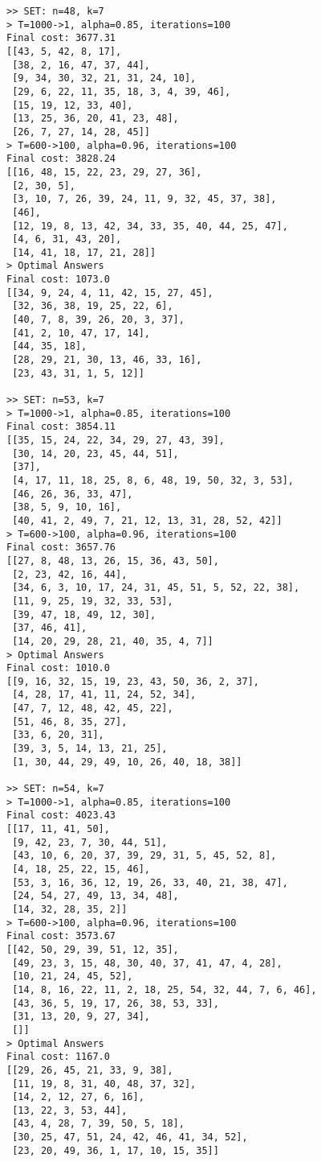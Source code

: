 \documentclass[12pt]{article}
\begin{document}
\begin{lstlisting}[breaklines=true]
>> SET: n=48, k=7
> T=1000->1, alpha=0.85, iterations=100
Final cost: 3677.31
[[43, 5, 42, 8, 17],
 [38, 2, 16, 47, 37, 44],
 [9, 34, 30, 32, 21, 31, 24, 10],
 [29, 6, 22, 11, 35, 18, 3, 4, 39, 46],
 [15, 19, 12, 33, 40],
 [13, 25, 36, 20, 41, 23, 48],
 [26, 7, 27, 14, 28, 45]]
> T=600->100, alpha=0.96, iterations=100
Final cost: 3828.24
[[16, 48, 15, 22, 23, 29, 27, 36],
 [2, 30, 5],
 [3, 10, 7, 26, 39, 24, 11, 9, 32, 45, 37, 38],
 [46],
 [12, 19, 8, 13, 42, 34, 33, 35, 40, 44, 25, 47],
 [4, 6, 31, 43, 20],
 [14, 41, 18, 17, 21, 28]]
> Optimal Answers
Final cost: 1073.0
[[34, 9, 24, 4, 11, 42, 15, 27, 45],
 [32, 36, 38, 19, 25, 22, 6],
 [40, 7, 8, 39, 26, 20, 3, 37],
 [41, 2, 10, 47, 17, 14],
 [44, 35, 18],
 [28, 29, 21, 30, 13, 46, 33, 16],
 [23, 43, 31, 1, 5, 12]]

>> SET: n=53, k=7
> T=1000->1, alpha=0.85, iterations=100
Final cost: 3854.11
[[35, 15, 24, 22, 34, 29, 27, 43, 39],
 [30, 14, 20, 23, 45, 44, 51],
 [37],
 [4, 17, 11, 18, 25, 8, 6, 48, 19, 50, 32, 3, 53],
 [46, 26, 36, 33, 47],
 [38, 5, 9, 10, 16],
 [40, 41, 2, 49, 7, 21, 12, 13, 31, 28, 52, 42]]
> T=600->100, alpha=0.96, iterations=100
Final cost: 3657.76
[[27, 8, 48, 13, 26, 15, 36, 43, 50],
 [2, 23, 42, 16, 44],
 [34, 6, 3, 10, 17, 24, 31, 45, 51, 5, 52, 22, 38],
 [11, 9, 25, 19, 32, 33, 53],
 [39, 47, 18, 49, 12, 30],
 [37, 46, 41],
 [14, 20, 29, 28, 21, 40, 35, 4, 7]]
> Optimal Answers
Final cost: 1010.0
[[9, 16, 32, 15, 19, 23, 43, 50, 36, 2, 37],
 [4, 28, 17, 41, 11, 24, 52, 34],
 [47, 7, 12, 48, 42, 45, 22],
 [51, 46, 8, 35, 27],
 [33, 6, 20, 31],
 [39, 3, 5, 14, 13, 21, 25],
 [1, 30, 44, 29, 49, 10, 26, 40, 18, 38]]

>> SET: n=54, k=7
> T=1000->1, alpha=0.85, iterations=100
Final cost: 4023.43
[[17, 11, 41, 50],
 [9, 42, 23, 7, 30, 44, 51],
 [43, 10, 6, 20, 37, 39, 29, 31, 5, 45, 52, 8],
 [4, 18, 25, 22, 15, 46],
 [53, 3, 16, 36, 12, 19, 26, 33, 40, 21, 38, 47],
 [24, 54, 27, 49, 13, 34, 48],
 [14, 32, 28, 35, 2]]
> T=600->100, alpha=0.96, iterations=100
Final cost: 3573.67
[[42, 50, 29, 39, 51, 12, 35],
 [49, 23, 3, 15, 48, 30, 40, 37, 41, 47, 4, 28],
 [10, 21, 24, 45, 52],
 [14, 8, 16, 22, 11, 2, 18, 25, 54, 32, 44, 7, 6, 46],
 [43, 36, 5, 19, 17, 26, 38, 53, 33],
 [31, 13, 20, 9, 27, 34],
 []]
> Optimal Answers
Final cost: 1167.0
[[29, 26, 45, 21, 33, 9, 38],
 [11, 19, 8, 31, 40, 48, 37, 32],
 [14, 2, 12, 27, 6, 16],
 [13, 22, 3, 53, 44],
 [43, 4, 28, 7, 39, 50, 5, 18],
 [30, 25, 47, 51, 24, 42, 46, 41, 34, 52],
 [23, 20, 49, 36, 1, 17, 10, 15, 35]]


\end{lstlisting}
\end{document}
